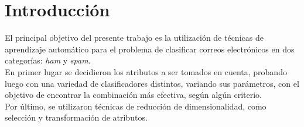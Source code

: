 \section{Introducción}

El principal objetivo del presente trabajo es la utilización de técnicas de aprendizaje automático para el problema de clasificar correos electr\'onicos en dos categorías: \emph{ham} y \emph{spam}.\\
En primer lugar se decidieron los atributos a ser tomados en cuenta, probando luego con una variedad de clasificadores distintos, variando sus parámetros, con el objetivo de encontrar la combinación más efectiva, según algún criterio.\\
Por último, se utilizaron técnicas de reducción de dimensionalidad, como selección y transformación de atributos.